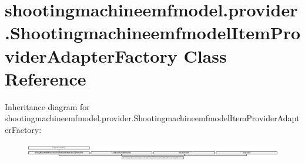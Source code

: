 \hypertarget{classshootingmachineemfmodel_1_1provider_1_1_shootingmachineemfmodel_item_provider_adapter_factory}{\section{shootingmachineemfmodel.\-provider.\-Shootingmachineemfmodel\-Item\-Provider\-Adapter\-Factory Class Reference}
\label{classshootingmachineemfmodel_1_1provider_1_1_shootingmachineemfmodel_item_provider_adapter_factory}
}
Inheritance diagram for shootingmachineemfmodel.\-provider.\-Shootingmachineemfmodel\-Item\-Provider\-Adapter\-Factory\-:\begin{figure}[H]
\begin{center}
\leavevmode
\includegraphics[height=0.789474cm]{classshootingmachineemfmodel_1_1provider_1_1_shootingmachineemfmodel_item_provider_adapter_factory}
\end{center}
\end{figure}
